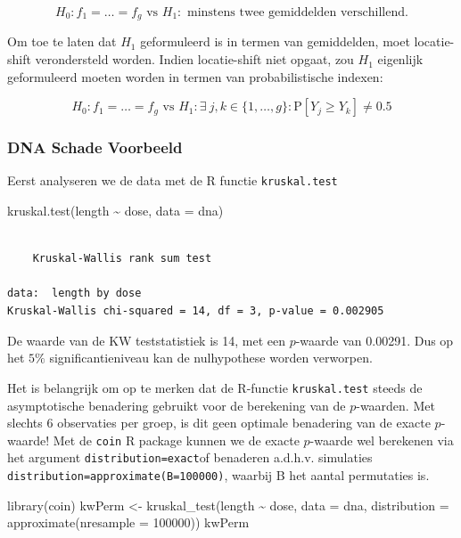\documentclass[
  dutch,
  letterpaper,
  12pt]{book}
\newenvironment{Shaded}{\begin{snugshade}}{\end{snugshade}}
\newcommand{\AttributeTok}[1]{\textcolor[rgb]{0.40,0.45,0.13}{#1}}
\newcommand{\DecValTok}[1]{\textcolor[rgb]{0.68,0.00,0.00}{#1}}
\newcommand{\FunctionTok}[1]{\textcolor[rgb]{0.28,0.35,0.67}{#1}}
\newcommand{\NormalTok}[1]{\textcolor[rgb]{0.00,0.23,0.31}{#1}}
\newcommand{\OtherTok}[1]{\textcolor[rgb]{0.00,0.23,0.31}{#1}}
\newcommand{\SpecialCharTok}[1]{\textcolor[rgb]{0.37,0.37,0.37}{#1}}
\theoremstyle{definition}
\theoremstyle{definition}
\theoremstyle{definition}
\theoremstyle{remark}
\begin{document}
\[H_0: f_1=\ldots=f_g \text{ vs } H_1: \text{ minstens twee gemiddelden verschillend}.\]

Om toe te laten dat \(H_1\) geformuleerd is in termen van gemiddelden,
moet locatie-shift verondersteld worden. Indien locatie-shift niet
opgaat, zou \(H_1\) eigenlijk geformuleerd moeten worden in termen van
probabilistische indexen:

\[H_0: f_1=\ldots=f_g \text{ vs } H_1: \exists\ j,k \in \{1,\ldots,g\} : \text{P}\left[Y_j\geq Y_k\right]\neq 0.5\]

\subsubsection{DNA Schade Voorbeeld}\label{dna-schade-voorbeeld}

Eerst analyseren we de data met de R functie \texttt{kruskal.test}

\begin{Shaded}
\begin{Highlighting}[]
\FunctionTok{kruskal.test}\NormalTok{(length }\SpecialCharTok{\textasciitilde{}}\NormalTok{ dose, }\AttributeTok{data =}\NormalTok{ dna)}
\end{Highlighting}
\end{Shaded}

\begin{verbatim}

    Kruskal-Wallis rank sum test

data:  length by dose
Kruskal-Wallis chi-squared = 14, df = 3, p-value = 0.002905
\end{verbatim}

De waarde van de KW teststatistiek is 14, met een \(p\)-waarde van
0.00291. Dus op het \(5\%\) significantieniveau kan de nulhypothese
worden verworpen.

Het is belangrijk om op te merken dat de R-functie \texttt{kruskal.test}
steeds de asymptotische benadering gebruikt voor de berekening van de
\(p\)-waarden. Met slechts 6 observaties per groep, is dit geen optimale
benadering van de exacte \(p\)-waarde! Met de \texttt{coin} R package
kunnen we de exacte \(p\)-waarde wel berekenen via het argument
\texttt{distribution=\textquotesingle{}exact\textquotesingle{}}of
benaderen a.d.h.v. simulaties
\texttt{distribution=approximate(B=100000)}, waarbij B het aantal
permutaties is.

\begin{Shaded}
\begin{Highlighting}[]
\FunctionTok{library}\NormalTok{(coin)}
\NormalTok{kwPerm }\OtherTok{\textless{}{-}} \FunctionTok{kruskal\_test}\NormalTok{(length }\SpecialCharTok{\textasciitilde{}}\NormalTok{ dose, }\AttributeTok{data =}\NormalTok{ dna,}
            \AttributeTok{distribution =} \FunctionTok{approximate}\NormalTok{(}\AttributeTok{nresample =} \DecValTok{100000}\NormalTok{))}
\NormalTok{kwPerm}
\end{Highlighting}
\end{Shaded}
\end{document}

